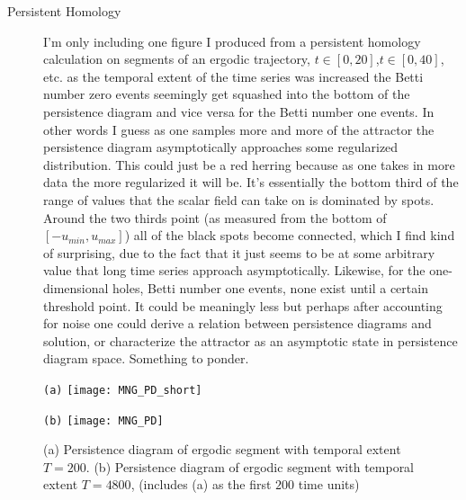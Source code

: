 \begin{description}
{\begin{description}
\item[Persistent Homology]
I'm only including one figure
I produced from a persistent homology calculation on segments of an ergodic trajectory,
$t \in [0,20]$,$t \in [0,40]$, etc. as the temporal extent of the time series was
increased the Betti number zero events seemingly get squashed into the bottom of the
persistence diagram and vice versa for the Betti number one events. In other words I guess
as one samples more and more of the attractor the persistence diagram asymptotically
approaches some regularized distribution. This could just be a red herring because
as one takes in more data the more regularized it will be. It's essentially the bottom third
of the range of values that the scalar field can take on is dominated by spots. Around the two
thirds point (as measured from the bottom of $[-u_{min},u_{max}]$) all of the black spots become
connected, which I find kind of surprising, due to the fact that it just seems to be at some arbitrary
value that long time series approach asymptotically. Likewise, for the one-dimensional holes, Betti number
one events, none exist until a certain threshold point. It could be meaningly less but perhaps after
accounting for noise one could derive a relation between persistence diagrams and solution, or characterize
the attractor as an asymptotic state in persistence diagram space. Something to ponder.

\end{description}
}

\begin{figure}
\begin{minipage}[height=.32\textheight]{.9\textwidth}
\centering \small{\texttt{(a)}}
\texttt{[image: MNG\_PD\_short]}
\end{minipage}
\begin{minipage}[height=.32\textheight]{.9\textwidth}
\centering \small{\texttt{(b)}}
\texttt{[image: MNG\_PD]}
\end{minipage}
\caption{ \label{fig:MNG_PD}
(a) Persistence diagram of ergodic segment with temporal extent $T=200$.
(b) Persistence diagram of ergodic segment with temporal extent $T=4800$, (includes (a) as
   the first $200$ time units)
}
\end{figure}


\end{description}
